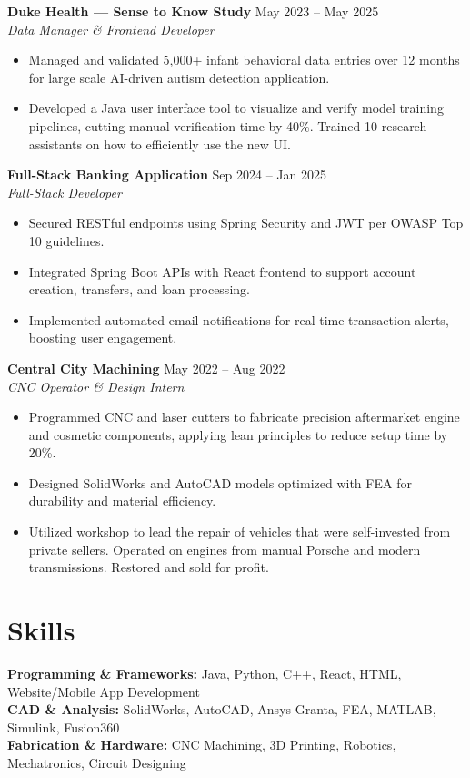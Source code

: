 \documentclass[11pt]{article}
\begin{document}
\textbf{Duke Health — Sense to Know Study} \hfill May 2023 -- May 2025\\
\textit{Data Manager \& Frontend Developer}
\begin{itemize}
    \item Managed and validated 5,000+ infant behavioral data entries over 12 months for large scale AI-driven autism detection application.
    \item Developed a Java user interface tool to visualize and verify model training pipelines, cutting manual verification time by 40\%. Trained 10 research assistants on how to efficiently use the new UI.
\end{itemize}

\textbf{Full-Stack Banking Application} \hfill Sep 2024 -- Jan 2025\\
\textit{Full-Stack Developer}
\begin{itemize}
    \item Secured RESTful endpoints using Spring Security and JWT per OWASP Top 10 guidelines.
    \item Integrated Spring Boot APIs with React frontend to support account creation, transfers, and loan processing.
    \item Implemented automated email notifications for real-time transaction alerts, boosting user engagement.
\end{itemize}

\textbf{Central City Machining} \hfill May 2022 -- Aug 2022\\
\textit{CNC Operator \& Design Intern}
\begin{itemize}
    \item Programmed CNC and laser cutters to fabricate precision aftermarket engine and cosmetic components, applying lean principles to reduce setup time by 20\%.
    \item Designed SolidWorks and AutoCAD models optimized with FEA for durability and material efficiency.
    \item Utilized workshop to lead the repair of vehicles that were self-invested from private sellers. Operated on engines from manual Porsche and modern transmissions. Restored and sold for profit.
\end{itemize}

\section*{Skills}
\textbf{Programming \& Frameworks:} Java, Python, C++, React, HTML, Website/Mobile App Development\\
\textbf{CAD \& Analysis:} SolidWorks, AutoCAD, Ansys Granta, FEA, MATLAB, Simulink,  Fusion360\\
\textbf{Fabrication \& Hardware:} CNC Machining, 3D Printing, Robotics, Mechatronics, Circuit Designing
\end{document}
